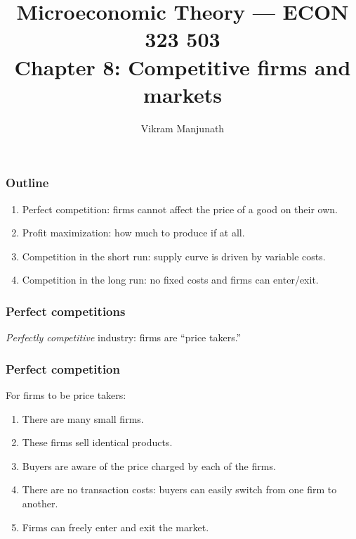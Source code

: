 \documentclass[xcolor=pdftex,dvipsnames]{beamer}
\title{Microeconomic Theory --- ECON 323 503 \\ Chapter 8: Competitive 
  firms and markets}
\author{Vikram Manjunath}       %
\institute{Texas A\&M University}
\begin{document}
\maketitle

\begin{frame}
\frametitle{Outline}
\begin{enumerate}[<+->]
\item Perfect competition: firms cannot affect the price of a good on
  their own.
\item Profit maximization: how much to produce if at all.
\item Competition in the short run: supply curve is driven by variable
  costs.
\item Competition in the long run: no fixed costs and firms can
  enter/exit.
\end{enumerate}
\end{frame}




\begin{frame}
\frametitle{Perfect competitions}
\emph{Perfectly competitive} industry: firms are ``price takers.''
\bigskip

\bigskip



\end{frame}





\begin{frame}
\frametitle{Perfect competition}
For firms to be price takers:
\begin{enumerate}[<+->]
\item There are many small firms.
\item These firms sell identical products.
\item Buyers are aware of the price charged by each of the firms.
\item There are no transaction costs: buyers can easily switch from one firm
  to another.
\item Firms can freely enter and exit the market.
\end{enumerate}
\end{frame}
\end{document}
